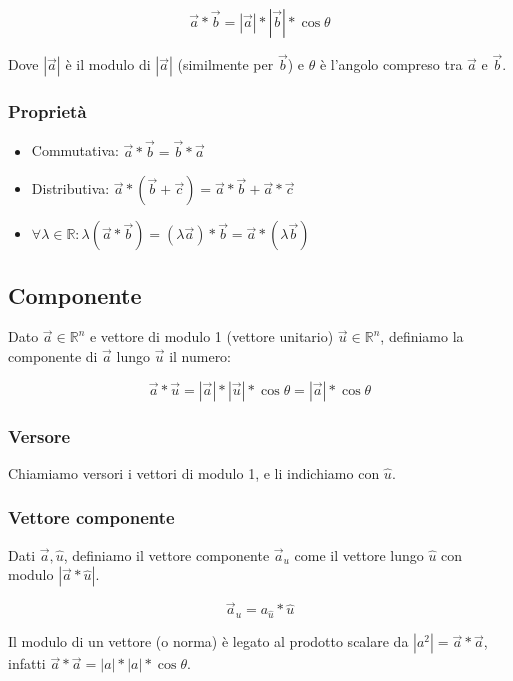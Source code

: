 \documentclass{article}
\begin{document}
$$
\vec{a} * \vec{b} = |\vec{a}| * |\vec{b}| * \cos{\theta}
$$

\noindent
Dove $|\vec{a}|$ è il modulo di $|\vec{a}|$ (similmente per $\vec{b}$) e $\theta$ è l'angolo compreso tra $\vec{a}$ e $\vec{b}$.

\subsubsection{Proprietà}

\begin{itemize}
\item Commutativa: $\vec{a} * \vec{b} = \vec{b} * \vec{a}$
\item Distributiva: $\vec{a} * (\vec{b}+\vec{c}) = \vec{a}*\vec{b} + \vec{a}*\vec{c}$
\item $\forall \lambda \in \mathbb{R} : \lambda (\vec{a} * \vec{b}) = (\lambda\vec{a}) * \vec{b} = \vec{a} * (\lambda\vec{b})$
\end{itemize}

\subsection{Componente}

Dato $\vec{a} \in \mathbb{R}^n$ e vettore di modulo 1 (vettore unitario)  $\vec{u} \in \mathbb{R}^n$, definiamo la componente di $\vec{a}$ lungo $\vec{u}$ il numero:

$$
\vec{a} * \vec{u} = |\vec{a}| * |\vec{u}| * \cos{\theta} = |\vec{a}| * \cos{\theta}
$$

\subsubsection{Versore}

Chiamiamo versori i vettori di modulo 1, e li indichiamo con $\hat{u}$.

\subsubsection{Vettore componente}

Dati $\vec{a}, \hat{u}$, definiamo il vettore componente $\vec{a}_u$ come il vettore lungo $\hat{u}$ con modulo $|\vec{a} * \hat{u}|$.

$$
\vec{a}_u = a_{\hat{u}} * \hat{u}
$$

\noindent
Il modulo di un vettore (o norma) è legato al prodotto scalare da $|a^2| = \vec{a} * \vec{a}$, infatti $\vec{a} * \vec{a} = |a| * |a| * \cos{\theta}$.
\end{document}
